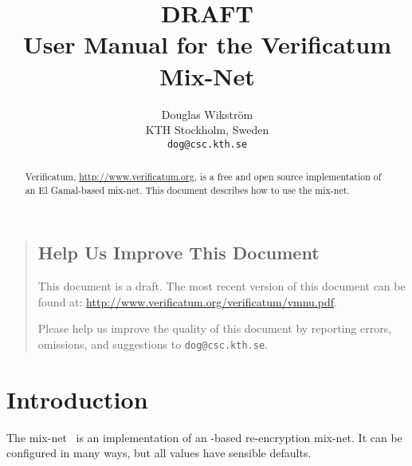 \documentclass[11pt]{article}
\title{{\Huge DRAFT}\\$\quad$\\User Manual for the Verificatum Mix-Net}
\author{Douglas Wikstr{\"o}m\\
KTH Stockholm, Sweden\\
\texttt{dog@csc.kth.se}}
\begin{document}


\maketitle

\thispagestyle{empty}

\begin{abstract}

  Verificatum, \url{http://www.verificatum.org}, is a free and open
  source implementation of an El Gamal-based mix-net. This document
  describes how to use the mix-net.

\end{abstract}

\begin{quote}

\vfill

\subsection*{Help Us Improve This Document}

This document is a draft. The most recent version of this
document can be found at:
\url{http://www.verificatum.org/verificatum/vmnu.pdf}.

Please help us improve the quality of this document by reporting
errors, omissions, and suggestions to
\texttt{dog@csc.kth.se}.


\end{quote}

\newpage

\begin{spacing}{0.9}

\setcounter{tocdepth}{1}

  \tableofcontents

\end{spacing}

\clearpage

\pagestyle{plain}
\setcounter{page}{1}

\section{Introduction}\label{sect:introduction}

The \veri mix-net~\cite{vmn} is an implementation of an \elgamal-based
re-encryption mix-net. It can be configured in many ways, but all
values have sensible defaults.
\end{document}
